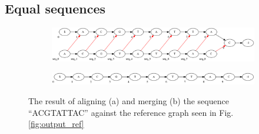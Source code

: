 \documentclass[thesis.tex]{subfiles}
\begin{document}
\subsection{Equal sequences}
\begin{figure}[H]
  \begin{subfigure}[t]{\textwidth}
    \begin{mdframed}
      \includegraphics[width=\textwidth]{outputs/equal-alignment.png}
    \end{mdframed}
    \subcaption{}
  \end{subfigure}
  \begin{subfigure}[t]{\textwidth}
    \begin{mdframed}
      \includegraphics[width=\textwidth]{outputs/equal-merge.png}
    \end{mdframed}
    \subcaption{}
  \end{subfigure}
  \caption{The result of aligning (a) and merging (b) the sequence ``ACGTATTAC'' against the reference graph seen in Fig. \ref{fig:output_ref}}
  \label{fig:output_equal}
\end{figure}
\end{document}
